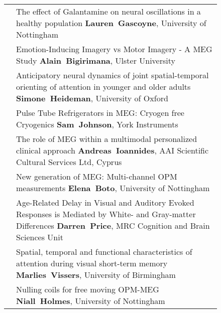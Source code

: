 \begin{figure}[htp]
\begin{tabularx}{\textwidth}{lp{.92\linewidth}}
\cellcolor{set2!50}{\bf B-30} & {\footnotesize The effect of Galantamine on neural oscillations in a healthy population
} {\bf\footnotesize Lauren~Gascoyne}, {\footnotesize University of Nottingham}  \\
\cellcolor{set1!50}{\bf B-31} & {\footnotesize Emotion-Inducing Imagery vs Motor Imagery - A MEG Study
} {\bf\footnotesize Alain~Bigirimana}, {\footnotesize Ulster University}  \\
\cellcolor{set1!50}{\bf B-32} & {\footnotesize Anticipatory neural dynamics of joint spatial-temporal orienting of attention in younger and older adults
} {\bf\footnotesize Simone~Heideman}, {\footnotesize University of Oxford}  \\
\cellcolor{set3!50}{\bf B-33} & {\footnotesize Pulse Tube Refrigerators in MEG: Cryogen free Cryogenics
} {\bf\footnotesize Sam~Johnson}, {\footnotesize York Instruments}  \\
\cellcolor{set3!50}{\bf B-34} & {\footnotesize The role of MEG within a multimodal personalized clinical approach 
} {\bf\footnotesize Andreas~Ioannides}, {\footnotesize AAI Scientific Cultural Services Ltd, Cyprus}  \\
\cellcolor{set3!50}{\bf B-35} & {\footnotesize New generation of MEG: Multi-channel OPM measurements
} {\bf\footnotesize Elena~Boto}, {\footnotesize University of Nottingham}  \\
\cellcolor{set2!50}{\bf B-36} & {\footnotesize Age-Related Delay in Visual and Auditory Evoked Responses is Mediated by White- and Gray-matter Differences
} {\bf\footnotesize Darren~Price}, {\footnotesize MRC Cognition and Brain Sciences Unit}  \\
\cellcolor{set1!50}{\bf B-37} & {\footnotesize Spatial, temporal and functional characteristics of attention during visual short-term memory
} {\bf\footnotesize Marlies~Vissers}, {\footnotesize University of Birmingham }  \\
\cellcolor{set3!50}{\bf B-38} & {\footnotesize Nulling coils for free moving OPM-MEG} {\bf\footnotesize Niall~Holmes}, {\footnotesize University of Nottingham}  \\
\bottomrule
\end{tabularx}
\end{figure}
